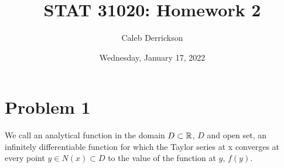 

\title{STAT 31020: Homework 2}
\author{Caleb Derrickson}
\date{Wednesday, January 17, 2022}


\onehalfspacing
\maketitle
\allowdisplaybreaks


\tableofcontents

\newpage
\section{Problem 1}
We call an analytical function in the domain $D \subset \mathbb{R}$, $D$ and open set, an infinitely differentiable function for which the Taylor series at x converges at every point $y \in N(x) \subset D$ to the value of the function at $y$, $f(y)$.

